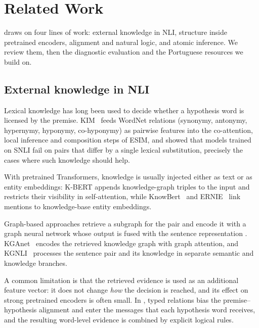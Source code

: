 \section{Related Work}
\label{sec:related}

\model{} draws on four lines of work: external knowledge in NLI, structure inside pretrained encoders,
alignment and natural logic, and atomic inference. We review them, then the diagnostic evaluation and the
Portuguese resources we build on.

\subsection{External knowledge in NLI}
\label{sec:rw-knowledge}

Lexical knowledge has long been used to decide whether a hypothesis word is licensed by the premise.
KIM~\citep{chen2018neural} feeds WordNet relations (synonymy, antonymy, hypernymy, hyponymy,
co-hyponymy) as pairwise features into the co-attention, local inference and composition steps of ESIM,
and \citet{glockner2018breaking} showed that models trained on SNLI fail on pairs that differ by a
single lexical substitution, precisely the cases where such knowledge should help.

With pretrained
Transformers, knowledge is usually injected either as text or as entity embeddings: K-BERT
\citep{liu2020kbert} appends knowledge-graph triples to the input and restricts their visibility in
self-attention, while KnowBert~\citep{peters2019knowledge} and ERNIE~\citep{zhang2019ernie} link
mentions to knowledge-base entity embeddings.

Graph-based approaches retrieve a subgraph for the pair
and encode it with a graph neural network whose output is fused with the sentence representation
\citep{kapanipathi2020infusing}. KGAnet~\citep{song2020kganet} encodes the retrieved knowledge graph with
graph attention, and KGNLI~\citep{wang2020knowledge} processes the sentence pair and its knowledge in
separate semantic and knowledge branches.

A common limitation is that the retrieved evidence is used as an additional feature vector: it does not
change \emph{how} the decision is reached, and its effect on strong pretrained encoders is often small.
In \model{}, typed relations bias the premise--hypothesis alignment and enter the messages that each
hypothesis word receives, and the resulting word-level evidence is combined by explicit logical rules.

